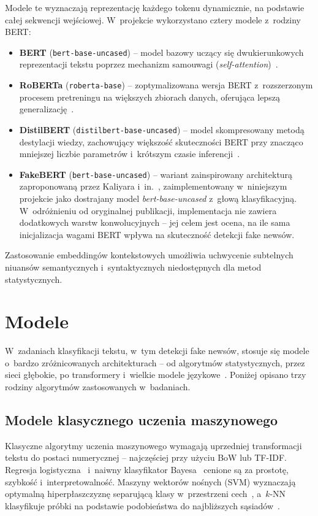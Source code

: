 \documentclass[oneside,polski,logo]{amuthesis}
\begin{document}
Modele te wyznaczają reprezentację każdego tokenu dynamicznie, na podstawie całej sekwencji wejściowej. W~projekcie wykorzystano cztery modele z~rodziny BERT:
\begin{itemize}
    \item \textbf{BERT} (\texttt{bert-base-uncased}) -- model bazowy uczący się dwukierunkowych reprezentacji tekstu poprzez mechanizm samouwagi (\textit{self-attention})~\cite{Devlin2019BERTPO}.
    \item \textbf{RoBERTa} (\texttt{roberta-base}) -- zoptymalizowana wersja BERT z~rozszerzonym procesem pretreningu na większych zbiorach danych, oferująca lepszą generalizację~\cite{Liu2019RoBERTa}.
    \item \textbf{DistilBERT} (\texttt{distilbert-base-uncased}) -- model skompresowany metodą destylacji wiedzy, zachowujący większość skuteczności BERT przy znacząco mniejszej liczbie parametrów i~krótszym czasie inferencji~\cite{sanh2020distilbert}.
    \item \textbf{FakeBERT} (\texttt{bert-base-uncased}) -- wariant zainspirowany architekturą zaproponowaną przez Kaliyara i~in.~\cite{Kaliyar2021}, zaimplementowany w~niniejszym projekcie jako dostrajany model \textit{bert-base-uncased} z~głową klasyfikacyjną. W~odróżnieniu od oryginalnej publikacji, implementacja nie zawiera dodatkowych warstw konwolucyjnych -- jej celem jest ocena, na ile sama inicjalizacja wagami BERT wpływa na skuteczność detekcji fake newsów.
\end{itemize}
Zastosowanie embeddingów kontekstowych umożliwia uchwycenie subtelnych niuansów semantycznych i~syntaktycznych niedostępnych dla metod statystycznych.


\section{Modele}

W~zadaniach klasyfikacji tekstu, w~tym detekcji fake newsów, stosuje się modele o~bardzo zróżnicowanych architekturach -- od algorytmów statystycznych, przez sieci głębokie, po transformery i~wielkie modele językowe~\cite{Jouhar2024, Alshuwaier2025}. Poniżej opisano trzy rodziny algorytmów zastosowanych w~badaniach.

\subsection{Modele klasycznego uczenia maszynowego}

Klasyczne algorytmy uczenia maszynowego wymagają uprzedniej transformacji tekstu do postaci numerycznej -- najczęściej przy użyciu BoW lub TF-IDF. Regresja logistyczna~\cite{Dreiseitl2002} i~naiwny klasyfikator Bayesa~\cite{Murphy2006NB} cenione są za prostotę, szybkość i~interpretowalność. Maszyny wektorów nośnych (SVM) wyznaczają optymalną hiperpłaszczyznę separującą klasy w~przestrzeni cech~\cite{Abdullah2021SVM, Jakkula2006SVM}, a~$k$-NN klasyfikuje próbki na podstawie podobieństwa do najbliższych sąsiadów~\cite{10.1007/978-3-540-39964-3_62}.
\end{document}
